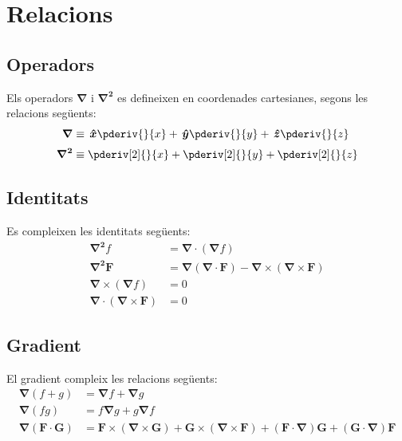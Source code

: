 \documentclass[catalan,a4paper,twoside,11pt]{article}
\begin{document}
\section{Relacions}

\subsection{Operadors}
\renewcommand{\va}{\ensuremath{\,\boldsymbol{\hat{x}}}}
\renewcommand{\vb}{\ensuremath{\,\boldsymbol{\hat{y}}}}
\renewcommand{\vc}{\ensuremath{\,\boldsymbol{\hat{z}}}}
Els operadors $\boldsymbol{\nabla}$ i $\boldsymbol{\nabla^2}$ es defineixen en coordenades cartesianes, segons les relacions següents:
\begin{align}
    \boldsymbol{\nabla} &\equiv \va \pderiv{}{x} + \vb \pderiv{}{y}
    + \vc \pderiv{}{z}\\[0.5ex]
    \boldsymbol{\nabla^2} &\equiv \pderiv[2]{}{x} + \pderiv[2]{}{y}+ \pderiv[2]{}{z}
\end{align}

\subsection{Identitats}
Es compleixen les identitats següents:
\begin{align}
    \boldsymbol{\nabla^2}f &=\boldsymbol{\nabla\cdot}(\boldsymbol{\nabla}f)\\
    \boldsymbol{\nabla^2 F}  &= \boldsymbol{\nabla}(\boldsymbol{\nabla\cdot F})
    - \boldsymbol{\nabla\times}(\boldsymbol{\nabla\times F})\\
    \boldsymbol{\nabla\times}(\boldsymbol{\nabla}f) &= 0\\
    \boldsymbol{\nabla\cdot}(\boldsymbol{\nabla\times F}) &= 0
\end{align}

\subsection{Gradient}
El gradient compleix les relacions següents:
\begin{align}
    \boldsymbol{\nabla}(f+g) &= \boldsymbol{\nabla}f + \boldsymbol{\nabla}g\\
    \boldsymbol{\nabla}(fg) &= f \boldsymbol{\nabla}g + g \boldsymbol{\nabla} f\\
    \boldsymbol{\nabla}(\boldsymbol{F\cdot G}) &=
    \boldsymbol{F\times}(\boldsymbol{\nabla\times G}) + \boldsymbol{G\times}(\boldsymbol{\nabla\times F}) +
    (\boldsymbol{F\cdot\nabla})\boldsymbol{G} + (\boldsymbol{G\cdot\nabla})\boldsymbol{F}
\end{align}
\end{document}
